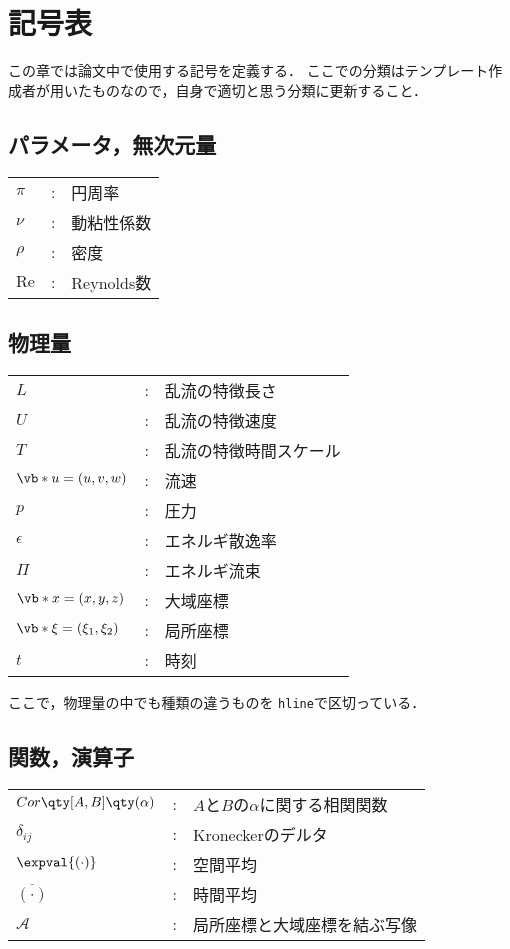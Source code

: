 \chapter*{記号表}

\begin{tcolorbox}
  この章では論文中で使用する記号を定義する．
  ここでの分類はテンプレート作成者が用いたものなので，自身で適切と思う分類に更新すること．
\end{tcolorbox}

\section*{パラメータ，無次元量}
\begin{tabular}{lll}
\(\pi\)  & : & 円周率 \\
\(\nu\)  & : & 動粘性係数 \\
\(\rho\) & : & 密度 \\
\(\mathrm{Re}\) & : & Reynolds数
\end{tabular}

\section*{物理量}
\begin{tabular}{lll}
\(L\) & : & 乱流の特徴長さ \\
\(U\) & : & 乱流の特徴速度 \\
\(T\) & : & 乱流の特徴時間スケール \\ \hline
\(\vb*{u}=(u,v,w)\)  & : & 流速 \\
\(p\) & : & 圧力 \\
\(\epsilon\) & : & エネルギ散逸率 \\
\(\varPi\) & : & エネルギ流束 \\ \hline
\(\vb*{x}=(x,y,z)\) & : & 大域座標 \\
\(\vb*{\xi}=(\xi_1,\xi_2)\) & : & 局所座標 \\
\(t\) & : & 時刻
\end{tabular}

\begin{tcolorbox}
  ここで，物理量の中でも種類の違うものを \texttt{hline}で区切っている．
\end{tcolorbox}

\section*{関数，演算子}
\begin{tabular}{lll}
\(Cor\qty[A,B]\qty(\alpha)\) & : & \(A\)と\(B\)の\(\alpha\)に関する相関関数 \\
\(\delta_{ij}\) & : & Kroneckerのデルタ \\
\(\expval{(\cdot)}\) & : & 空間平均 \\
\(\overline{(\cdot)}\) & : & 時間平均 \\
\(\mathcal{A}\) & : & 局所座標と大域座標を結ぶ写像
\end{tabular}

